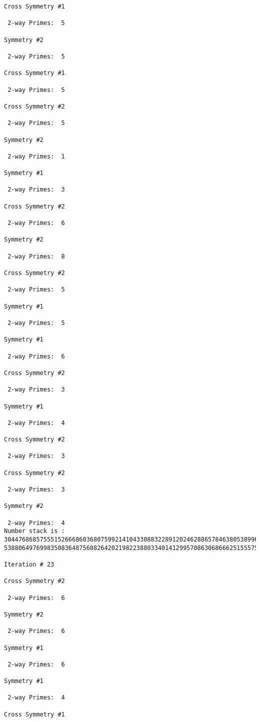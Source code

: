 {{{{\begin{verbatim}
Cross Symmetry #1

 2-way Primes: 	5

Symmetry #2

 2-way Primes: 	5

Cross Symmetry #1

 2-way Primes: 	5

Cross Symmetry #2

 2-way Primes: 	5

Symmetry #2

 2-way Primes: 	1

Symmetry #1

 2-way Primes: 	3

Cross Symmetry #2

 2-way Primes: 	6

Symmetry #2

 2-way Primes: 	8

Cross Symmetry #2

 2-way Primes: 	5

Symmetry #1

 2-way Primes: 	5

Symmetry #1

 2-way Primes: 	6

Cross Symmetry #2

 2-way Primes: 	3

Symmetry #1

 2-way Primes: 	4

Cross Symmetry #2

 2-way Primes: 	3

Cross Symmetry #2

 2-way Primes: 	3

Symmetry #2

 2-way Primes: 	4
Number stack is :
30447686857555152666860368075992141043308832289120246288657846380538996794608835958544046240163340857
53880649769983508364875688264202198223880334014129957086306866625155575868674403758043361042640445859

Iteration #	23

Cross Symmetry #2

 2-way Primes: 	6

Symmetry #2

 2-way Primes: 	6

Symmetry #1

 2-way Primes: 	6

Symmetry #1

 2-way Primes: 	4

Cross Symmetry #1


\end{verbatim}}}}}
